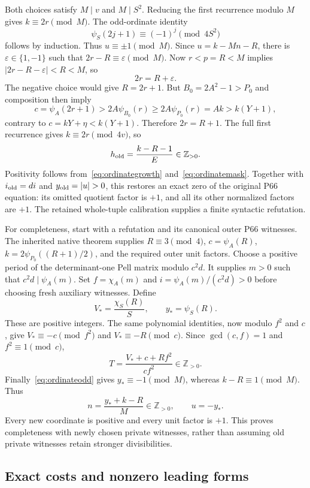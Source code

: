 Both choices satisfy $M\mid v$ and $M\mid S^2$. Reducing the first
recurrence modulo $M$ gives $k\equiv2r\pmod M$. The odd-ordinate identity
\begin{equation}\label{eq:ordinateodd}
 \psi_S(2j+1)\equiv(-1)^j\pmod{4S^2}
\end{equation}
follows by induction. Thus $u\equiv\pm1\pmod M$. Since
$u=k-Mn-R$, there is $\varepsilon\in\{1,-1\}$ such that
$2r-R\equiv\varepsilon\pmod M$. Now $r<p=R<M$ implies
$|2r-R-\varepsilon|<R<M$, so
\[
 2r=R+\varepsilon.
\]
The negative choice would give $R=2r+1$. But $B_0=2A^2-1>P_0$ and
composition then imply
\[
 c=\psi_A(2r+1)>2A\psi_{B_0}(r)
 \ge2A\psi_{P_0}(r)=Ak>k(Y+1),
\]
contrary to $c=kY+\eta<k(Y+1)$. Therefore $2r=R+1$.
The full first recurrence gives $k\equiv2r\pmod{4v}$, so
\begin{equation}\label{eq:ordinatehrestore}
 h_{\rm old}=\frac{k-R-1}{E}\in\mathbb Z_{>0}.
\end{equation}
Positivity follows from~\eqref{eq:ordinategrowth} and~\eqref{eq:ordinatemask}.
Together with $i_{\rm old}=di$ and $y_{\rm old}=|u|>0$, this restores
an exact zero of the original P66 equation: its omitted quotient factor
is $+1$, and all its other normalized factors are $+1$.
The retained whole-tuple calibration supplies a finite syntactic refutation.

For completeness, start with a refutation and its canonical outer P66
witnesses. The inherited native theorem supplies $R\equiv3\pmod4$,
$c=\psi_A(R)$, $k=2\psi_{P_0}((R+1)/2)$, and the required outer unit
factors. Choose a positive period of the determinant-one Pell matrix
modulo $c^2d$. It supplies $m>0$ such that $c^2d\mid\psi_A(m)$.
Set $f=\chi_A(m)$ and $i=\psi_A(m)/(c^2d)>0$ before choosing fresh
auxiliary witnesses. Define
\[
 V_* = \frac{\chi_S(R)}S,\qquad y_* =\psi_S(R).
\]
These are positive integers. The same polynomial identities, now modulo
$f^2$ and $c$, give $V_*\equiv-c\pmod{f^2}$ and
$V_*\equiv-R\pmod c$. Since $\gcd(c,f)=1$ and $f^2\equiv1\pmod c$,
\[
 T=\frac{V_*+c+Rf^2}{cf^2}\in\mathbb Z_{>0}.
\]
Finally~\eqref{eq:ordinateodd} gives $y_*\equiv-1\pmod M$, whereas
$k-R\equiv1\pmod M$. Thus
\[
 n=\frac{y_*+k-R}{M}\in\mathbb Z_{>0},\qquad u=-y_*.
\]
Every new coordinate is positive and every unit factor is $+1$. This proves
completeness with newly chosen private witnesses, rather than assuming old
private witnesses retain stronger divisibilities.

\subsection{Exact costs and nonzero leading forms}

